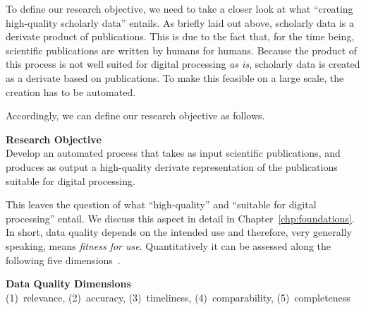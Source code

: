 
To define our research objective, we need to take a closer look at what ``creating high-quality scholarly data'' entails. As briefly laid out above, scholarly data is a derivate product of publications. This is due to the fact that, for the time being, scientific publications are written by humans for humans. Because the product of this process is not well suited for digital processing \emph{as is}, scholarly data is created as a derivate based on publications. To make this feasible on a large scale, the creation has to be automated.

Accordingly, we can define our research objective as follows.

\begin{infobox-objective}
\textbf{Research Objective}\\
Develop an automated process that takes as input scientific publications, and produces as output a high-quality derivate representation of the publications suitable for digital processing.
\end{infobox-objective}

This leaves the question of what ``high-quality'' and ``suitable for digital processing'' entail. We discuss this aspect in detail in Chapter~\ref{chp:foundations}. In short, data quality depends on the intended use and therefore, very generally speaking, means \emph{fitness for use}. Quantitatively it can be assessed along the following five dimensions~\cite{Herzog2007}.

\begin{infobox-progress}
      \textbf{Data Quality Dimensions}\\
       (1)~relevance, (2)~accuracy, (3)~timeliness, (4)~comparability, (5)~completeness
\end{infobox-progress}


